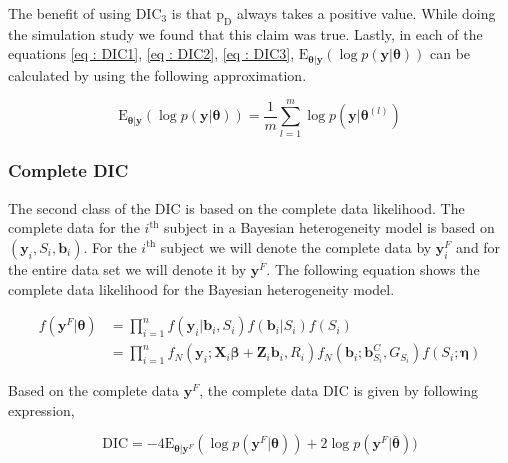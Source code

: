 The benefit of using $\text{DIC}_3$ is that $\text{p}_\text{D}$ always takes a positive value. While doing the simulation study we found that this claim was true. Lastly, in each of the equations \ref{eq : DIC1}, \ref{eq : DIC2}, \ref{eq : DIC3},  $\text{E}_{\boldsymbol{\theta}|\boldsymbol{y}}(\log{p(\boldsymbol{y}|\boldsymbol{\theta})}) $ can be calculated by using the following approximation.

\begin{equation}
\label{eq : mean_posterior_deviance_approx}
\text{E}_{\boldsymbol{\theta}|\boldsymbol{y}}(\log{p(\boldsymbol{y}|\boldsymbol{\theta})})  = \frac 1 m \sum_{l=1}^m\log{p(\boldsymbol{y}|\boldsymbol{\theta}^{(l)})}
\end{equation}

\subsubsection{Complete DIC}
The second class of the DIC is based on the complete data likelihood. The complete data for the $i^\text{th}$ subject in a Bayesian heterogeneity model is based on $(\boldsymbol{y}_i, S_i, \boldsymbol{b}_i)$. For the $i^\text{th}$ subject we will denote the complete data by $\boldsymbol{y}_i^F$ and for the entire data set we will denote it by $\boldsymbol{y}^F$. The following equation shows the complete data likelihood for the Bayesian heterogeneity model.

\begin{equation}
\label{eq : complete_data_likelihood}
\begin{split}
f(\boldsymbol{y}^F | \boldsymbol{\theta}) & = \prod_{i=1}^n f(\boldsymbol{y}_i|\boldsymbol{b}_i, S_i) f(\boldsymbol{b}_i|S_i) f(S_i)\\
& = \prod_{i=1}^n f_N(\boldsymbol{y}_i; \boldsymbol{X}_i\boldsymbol{\beta} + \boldsymbol{Z}_i \boldsymbol{b}_i, R_i) f_N(\boldsymbol{b}_i; \boldsymbol{b}_{S_i}^C, G_{S_i}) f(S_i; \boldsymbol{\eta})
\end{split}
\end{equation}

Based on the complete data $\boldsymbol{y}^F$, the complete data DIC is given by following expression,

\begin{equation}
\label{eq : complete_data_dic}
\text{DIC} = -4\text{E}_{\boldsymbol{\theta}|\boldsymbol{y}^F}(\log{p(\boldsymbol{y}^F|\boldsymbol{\theta})}) + 
2\log{p(\boldsymbol{y}^F|\boldsymbol{\bar{\theta}})})
\end{equation}

